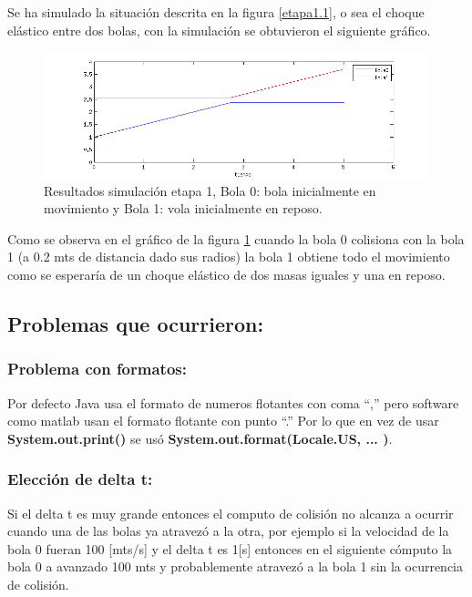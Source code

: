 \documentclass[a4paper,10pt]{article}
\begin{document}
Se ha simulado la situación descrita en la figura \ref{etapa1.1}, o sea el choque elástico entre dos
bolas, con la simulación se obtuvieron el siguiente gráfico.

\begin{figure}[H]
 \centering
 \includegraphics[scale=0.5]{./simulacion_etapa1.png}
 \caption{Resultados simulación etapa 1, Bola 0: bola inicialmente en movimiento y Bola 1: vola inicialmente en reposo.}
  \label{etapa1.2}
\end{figure}

Como se observa en el gráfico de la figura \ref{etapa1.2} cuando la bola 0 colisiona con la bola 1 (a 0.2 mts de distancia dado sus radios) 
la bola 1 obtiene todo el movimiento como se esperaría de un choque elástico de dos masas iguales y una en reposo.\newline

\subsection{Problemas que ocurrieron:}

\subsubsection{Problema con formatos:}


Por defecto Java usa el formato de numeros flotantes con coma ``,'' pero software como matlab usan el formato flotante con punto ``.''
Por lo que en vez de usar \textbf{System.out.print()} se usó \textbf{System.out.format(Locale.US, ... )}.\newline


\subsubsection{Elección de delta t:}


Si el delta t es muy grande entonces el computo de colisión no alcanza a ocurrir cuando una de las bolas ya atravezó a la otra, por ejemplo
si la velocidad de la bola 0 fueran 100 [mts/s] y el delta t es 1[s] entonces en el siguiente cómputo la bola 0 a avanzado 100 mts y probablemente
atravezó a la bola 1 sin la ocurrencia de colisión.\newline
\end{document}
